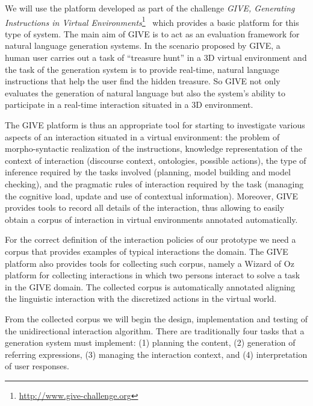We will use the platform developed as part of
the challenge \emph{GIVE, Generating Instructions in Virtual Environments}\footnote{\url{http://www.give-challenge.org}}~\cite{byron09} which provides a basic
platform for this type of system.
The main aim of GIVE is to act as an evaluation framework for
natural language generation systems. 
In the scenario proposed by GIVE, a
human user carries out a task of ``treasure hunt'' in a 3D virtual environment
and the task of the generation system is to provide real-time, natural
language instructions that help the user find the hidden treasure. So GIVE not
only evaluates the generation of natural language but also the system's ability
to participate in a real-time interaction situated in a 3D environment.

The GIVE platform is thus an appropriate tool for starting to investigate
various aspects of an interaction situated in a virtual environment: the problem
of
morpho-syntactic realization of the instructions, knowledge representation of
the context of interaction (discourse context, ontologies, possible actions),
the type of inference required by the tasks involved (planning, model building
and model checking), and the pragmatic rules of interaction required by the task
(managing the cognitive load, update and use of contextual information).
Moreover, GIVE provides tools to record all details of the interaction, thus
allowing to easily obtain a corpus of interaction in virtual environments
annotated automatically.

For the correct definition of the interaction policies of our prototype we need
a corpus that provides examples of typical interactions the domain. The GIVE
platform also provides tools for collecting such corpus, namely a Wizard of Oz
platform for collecting interactions in which two persons interact to solve a
task in the GIVE domain. The collected corpus is automatically annotated
aligning the linguistic interaction with the discretized actions in the virtual
world. 

From the collected corpus we will begin the design, implementation and testing
of the unidirectional interaction algorithm. There are traditionally four tasks
that a generation system must implement: (1) planning the content, (2)
generation of referring expressions, (3) managing the interaction context, and
(4) interpretation of user responses. 

